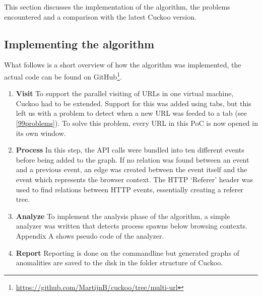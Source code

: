 This section discusses the implementation of the algorithm, the problems encountered and a comparison with the latest Cuckoo version.

\subsection{Implementing the algorithm}

What follows is a short overview of how the algorithm was implemented, the actual code can be found on GitHub\footnote{\url{https://github.com/MartijnB/cuckoo/tree/multi-url}}.

\begin{enumerate}
\item \textbf{Visit} To support the parallel visiting of URLs in one virtual machine, Cuckoo had to be extended. Support for this was added using tabs, but this left us with a problem to detect when a new URL was feeded to a tab (see \ref{99problems}). To solve this problem, every URL in this PoC is now opened in its own window.

\item \textbf{Process} In this step, the API calls were bundled into ten different events before being added to the graph. If no relation was found between an event and a previous event, an edge was created between the event itself and the event which represents the browser context. The HTTP `Referer' header was used to find relations between HTTP events, essentially creating a referer tree\cite{qui}. 

\item \textbf{Analyze} To implement the analysis phase of the algorithm, a simple analyzer was written that detects process spawns below browsing contexts. Appendix A shows pseudo code of the analyzer.


\item \textbf{Report} Reporting is done on the commandline but generated graphs of anomalities are saved to the disk in the folder structure of Cuckoo.
\end{enumerate}

